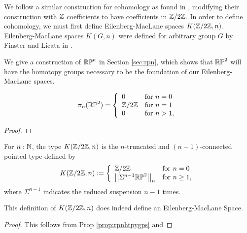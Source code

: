 \documentclass{amsart}
\begin{document}
We follow a similar construction for cohomology as found in \cite{brunerie:thesis}, modifying their construction with $\mathbb{Z}$ coefficients to have coefficients in $\mathbb{Z}/2\mathbb{Z}$. In order to define cohomology, we must first define Eilenberg-MacLane spaces $K(\mathbb{Z}/2\mathbb{Z},n)$. Eilenberg-MacLane spaces $K(G,n)$ were defined for arbitrary group $G$ by Finster and Licata in \cite{fl:em}.

We give a construction of $\mathbb{RP}^n$ in Section \ref{sec:rpn}, which shows that $\mathbb{RP}^2$ will have the homotopy groups necessary to be the foundation of our Eilenberg-MacLane spaces. 
\begin{proposition}\label{prop:rpnhtpygps} %
	\[ \pi_n(\mathbb{RP}^2)=\left\{ \begin{array}{ll} 0 & \text{for }n=0\\
	\mathbb{Z}/2\mathbb{Z} & \text{for } n=1\\
	0 & \text{for } n> 1, 
	\end{array}\right.\]
\end{proposition}
\begin{proof}
\end{proof}


\begin{definition}\label{def:EM-space}
	For $n:\mathbb{N}$, the type  $K(\mathbb{Z}/2\mathbb{Z},n)$ is the $n$-truncated and $(n-1)$-connected pointed type defined by
	\[ K(\mathbb{Z}/2\mathbb{Z},n):=\left\{ \begin{array}{ll} \mathbb{Z}/2\mathbb{Z} & \text{for }n=0\\
	\left| \left| \Sigma^{n-1}\mathbb{RP}^2\right| \right|_n & \text{for } n\ge 1, 
	\end{array}\right.\]
	where $\Sigma^{n-1}$ indicates the reduced suspension $n-1$ times. 
\end{definition}

\begin{proposition}
	This definition of $K(\mathbb{Z}/2\mathbb{Z},n)$ does indeed define an Eilenberg-MacLane Space. 
\end{proposition}

\begin{proof} This follows from Prop \ref{prop:rpnhtpygps} and
\end{proof}
\end{document}
